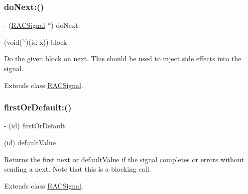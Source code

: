 \subsubsection{\texorpdfstring{do\+Next\+:()}{doNext:()}\hspace{0.1cm}{\footnotesize\ttfamily [3/3]}}
{\footnotesize\ttfamily -\/ (\mbox{\hyperlink{interface_r_a_c_signal}{R\+A\+C\+Signal}} $\ast$) do\+Next\+: \begin{DoxyParamCaption}\item[{(void($^\wedge$)(id x))}]{block }\end{DoxyParamCaption}}

Do the given block on {\ttfamily next}. This should be used to inject side effects into the signal. 

Extends class \mbox{\hyperlink{interface_r_a_c_signal_a36028c2d987159f5210840358f4877c9}{R\+A\+C\+Signal}}.

\mbox{\label{category_r_a_c_signal_07_operations_08_a51f980781f2dc9e662278d7db7b0cd38}} 
\subsubsection{\texorpdfstring{first\+Or\+Default\+:()}{firstOrDefault:()}\hspace{0.1cm}{\footnotesize\ttfamily [1/3]}}
{\footnotesize\ttfamily -\/ (id) first\+Or\+Default\+: \begin{DoxyParamCaption}\item[{(id)}]{default\+Value }\end{DoxyParamCaption}}

Returns the first {\ttfamily next} or {\ttfamily default\+Value} if the signal completes or errors without sending a {\ttfamily next}. Note that this is a blocking call. 

Extends class \mbox{\hyperlink{interface_r_a_c_signal_a51f980781f2dc9e662278d7db7b0cd38}{R\+A\+C\+Signal}}.

\mbox{\label{category_r_a_c_signal_07_operations_08_a51f980781f2dc9e662278d7db7b0cd38}} 
